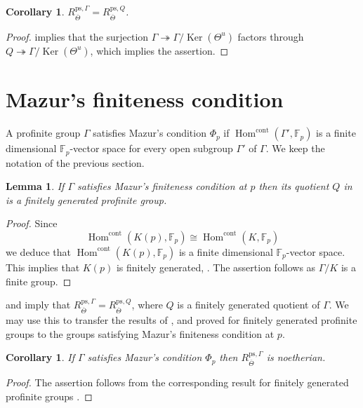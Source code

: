 \documentclass{amsart}
\newtheorem{lem}[prop]{Lemma}
\newtheorem{cor}[prop]{Corollary}
\theoremstyle{definition}
\theoremstyle{remark}
\DeclareMathOperator{\Hom}{Hom}
\DeclareMathOperator{\Ker}{Ker}
\newcommand{\Fp}{\mathbb F_p}
\newcommand{\cont}{\mathrm{cont}}
\newcommand{\Thetabar}{\overline{\Theta}}
\newcommand{\ps}{\mathrm{ps}}
\begin{document}
\begin{cor}\label{same_ring} $R^{\ps, \Gamma}_{\Thetabar}= R^{\ps, Q}_{\Thetabar}$.
\end{cor}
\begin{proof} implies that 
the surjection $\Gamma\twoheadrightarrow \Gamma/\Ker(\Theta^u)$ factors through 
$Q\twoheadrightarrow \Gamma/\Ker(\Theta^u)$, 
which implies the assertion.
\end{proof}

\section{Mazur's finiteness condition}

A profinite group $\Gamma$ satisfies Mazur's  condition $\Phi_p$ if 
$\Hom^{\cont}(\Gamma', \Fp)$ is a finite dimensional $\Fp$-vector 
space 
for every open subgroup 
$\Gamma'$ of $\Gamma$. We keep the notation of the previous section.

\begin{lem}\label{fg} If $\Gamma$ satisfies Mazur's finiteness condition at $p$ then its quotient $Q$ in 
is a finitely generated profinite group.
\end{lem}
\begin{proof} Since
\begin{equation}
\Hom^{\cont}(K(p), \Fp)\cong \Hom^{\cont}(K, \Fp)
\end{equation}
we deduce that $\Hom^{\cont}(K(p), \Fp)$ is a finite dimensional $\Fp$-vector space. This implies that $K(p)$ is finitely generated, \cite[Lemma 2.1]{Gouvea}.
The assertion follows as $\Gamma/K$ is a finite group.
\end{proof}

 and  imply that 
$R^{\ps, \Gamma}_{\Thetabar}= R^{\ps, Q}_{\Thetabar}$, 
where $Q$ is a finitely generated quotient of $\Gamma$. 
We may use this to transfer the results of 
\cite{quast}, \cite{defG} and \cite{inf_laf} 
proved for finitely generated profinite groups to the groups
satisfying Mazur's finiteness condition at $p$.

\begin{cor}\label{Phi_p_noeth} If $\Gamma$ satisfies Mazur's  condition 
$\Phi_p$ then $R^{\ps, \Gamma}_{\Thetabar}$ is noetherian.
\end{cor}
\begin{proof} The assertion follows from the corresponding 
result for finitely generated profinite groups \cite[Theorem 5.7]{quast}.
\end{proof}
\end{document}
